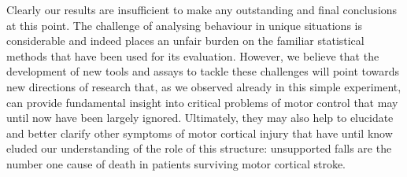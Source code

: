 Clearly our results are insufficient to make any outstanding and final conclusions at this point. The challenge of analysing behaviour in unique situations is considerable and indeed places an unfair burden on the familiar statistical methods that have been used for its evaluation. However, we believe that the development of new tools and assays to tackle these challenges will point towards new directions of research that, as we observed already in this simple experiment, can provide fundamental insight into critical problems of motor control that may until now have been largely ignored. Ultimately, they may also help to elucidate and better clarify other symptoms of motor cortical injury that have until know eluded our understanding of the role of this structure: unsupported falls are the number one cause of death in patients surviving motor cortical stroke.
